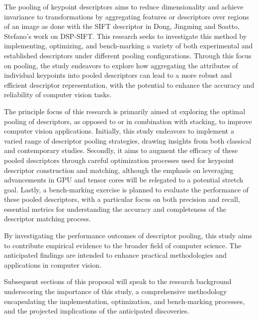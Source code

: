 The pooling of keypoint descriptors aims to reduce dimensionality and achieve invariance to transformations by aggregating features or descriptors over regions of an image as done with the SIFT descriptor in Dong, Jingming and Soatto, Stefano's work on DSP-SIFT\cite{dong2015domain}. This research seeks to investigate this method by implementing, optimizing, and bench-marking a variety of both experimental and established descriptors under different pooling configurations. Through this focus on pooling, the study endeavors to explore how aggregating the attributes of individual keypoints into pooled descriptors can lead to a more robust and efficient descriptor representation, with the potential to enhance the accuracy and reliability of computer vision tasks. 

The principle focus of this research is primarily aimed at exploring the optimal pooling of descriptors, as opposed to or in combination with stacking, to improve computer vision applications. Initially, this study endeavors to implement a varied range of descriptor pooling strategies, drawing insights from both classical and contemporary studies. Secondly, it aims to augment the efficacy of these pooled descriptors through careful optimization processes used for keypoint descriptor construction and matching, although the emphasis on leveraging advancements in GPU and tensor cores will be relegated to a potential stretch goal. Lastly, a bench-marking exercise is planned to evaluate the performance of these pooled descriptors, with a particular focus on both precision and recall, essential metrics for understanding the accuracy and completeness of the descriptor matching process.

By investigating the performance outcomes of descriptor pooling, this study aims to contribute empirical evidence to the broader field of computer science. The anticipated findings are intended to enhance practical methodologies and applications in computer vision.

Subsequent sections of this proposal will speak to the research background underscoring the importance of this study, a comprehensive methodology encapsulating the implementation, optimization, and bench-marking processes, and the projected implications of the anticipated discoveries.